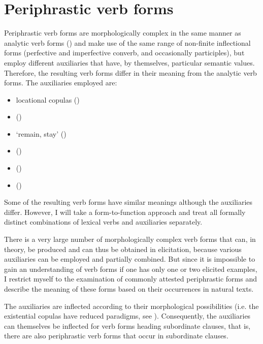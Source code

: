 \chapter{Periphrastic verb forms}
\label{cpt:Periphrastic verb forms}

Periphrastic verb forms are morphologically complex in the same manner as analytic verb forms () and make use of the same range of non-finite inflectional forms (perfective and imperfective converb, and occasionally participles), but employ different auxiliaries that have, by themselves, particular semantic values. Therefore, the resulting verb forms differ in their meaning from the analytic verb forms. The auxiliaries employed are:
%
\begin{itemize}
	\item	locational copulas ()
	\item	{}  ()
	\item	{} `remain, stay' ()
	\item	{}  ()
	\item	{}  ()
	\item	{}  ()
\end{itemize}

Some of the resulting verb forms have similar meanings although the auxiliaries differ. However, I will take a form-to-function approach and treat all formally distinct combinations of lexical verbs and auxiliaries separately.

There is a very large number of morphologically complex verb forms that can, in theory, be produced and can thus be obtained in elicitation, because various auxiliaries can be employed and partially combined. But since it is impossible to gain an understanding of verb forms if one has only one or two elicited examples, I restrict myself to the examination of commonly attested periphrastic forms and describe the meaning of these forms based on their occurrences in natural texts.

The auxiliaries are inflected according to their morphological possibilities (i.e. the existential copulas have reduced paradigms, see ). Consequently, the auxiliaries can themselves be inflected for verb forms heading subordinate clauses, that is, there are also periphrastic verb forms that occur in subordinate clauses.



